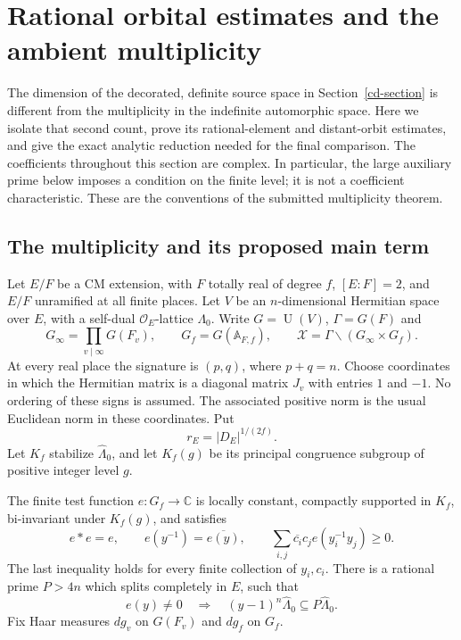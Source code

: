 \section{Rational orbital estimates and the ambient multiplicity}
\label{amb-section}

The dimension of the decorated, definite source space in
Section~\ref{cd-section} is different from the multiplicity in the
indefinite automorphic space. Here we isolate that second count,
prove its rational-element and distant-orbit estimates, and give the
exact analytic reduction needed for the final comparison. The
coefficients throughout this section are complex. In particular, the
large auxiliary prime below imposes a condition on the finite level;
it is not a coefficient characteristic. These are the conventions of
the submitted multiplicity theorem.\cite{alpo-uniform-source}

\subsection{The multiplicity and its proposed main term}

Let $E/F$ be a CM extension, with $F$ totally real of degree $f$,
$[E:F]=2$, and $E/F$ unramified at all finite places. Let $V$ be an
$n$-dimensional Hermitian space over $E$, with a self-dual
$\mathcal O_E$-lattice $\Lambda_0$. Write $G=\operatorname U(V)$,
$\Gamma=G(F)$ and
\[
 G_\infty=\prod_{v\mid\infty}G(F_v),\qquad
 G_f=G(\mathbb A_{F,f}),\qquad
 \mathcal X=\Gamma\backslash(G_\infty\times G_f).
\]
At every real place the signature is $(p,q)$, where $p+q=n$.
Choose coordinates in which the Hermitian matrix is a diagonal
matrix $J_v$ with entries $1$ and $-1$. No ordering of these signs
is assumed. The associated positive norm is the usual Euclidean
norm in these coordinates. Put
\[
                       r_E=|D_E|^{1/(2f)}.
\]
Let $K_f$ stabilize $\widehat\Lambda_0$, and let $K_f(g)$ be its
principal congruence subgroup of positive integer level $g$.

The finite test function $e:G_f\to\mathbb C$ is locally constant,
compactly supported in $K_f$, bi-invariant under $K_f(g)$, and
satisfies
\begin{equation}\label{amb-idempotent}
 e*e=e,\qquad e(y^{-1})=\overline{e(y)},\qquad
 \sum_{i,j}\overline{c_i}c_j e(y_i^{-1}y_j)\ge0.
\end{equation}
The last inequality holds for every finite collection of $y_i,c_i$.
There is a rational prime $P>4n$ which splits completely in $E$,
such that
\begin{equation}\label{amb-unipotent-level}
 e(y)\ne0\quad\Longrightarrow\quad
             (y-1)^n\widehat\Lambda_0\subseteq
                                      P\widehat\Lambda_0.
\end{equation}
Fix Haar measures $dg_v$ on $G(F_v)$ and $dg_f$ on $G_f$.

